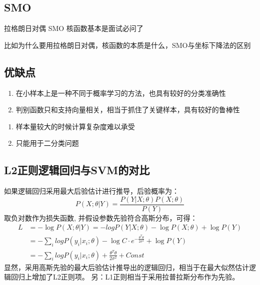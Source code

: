 \subsection{SMO}
拉格朗日对偶
SMO
核函数基本是面试必问了

比如为什么要用拉格朗日对偶，核函数的本质是什么，SMO与坐标下降法的区别

\subsection{优缺点}
{}
\begin{enumerate}
\item 在小样本上是一种不同于概率学习的方法，也具有较好的分类准确性
\item 判别函数只和支持向量相关，相当于抓住了关键样本，具有较好的鲁棒性
\end{enumerate}

{}
\begin{enumerate}
\item 样本量较大的时候计算复杂度难以承受
\item 只能用于二分类问题
\end{enumerate}



\subsection{L2正则逻辑回归与SVM的对比}
如果逻辑回归采用最大后验估计进行推导，后验概率为：
\begin{equation*}
    P(X;\theta|Y) = \frac{P(Y|X;\theta)P(X;\theta)}{P(Y)}
\end{equation*}
取负对数作为损失函数, 并假设参数先验符合高斯分布，可得：
\begin{align*}
    L &= -\log P(X;\theta|Y) = -log P(Y|X;\theta) - \log P(X;\theta) + \log P(Y) \\
    &= -\sum_i log P(y_i|x_i;\theta) - \log C\cdot e^{-\frac{\theta^T\theta}{2\sigma^2}} + \log P(Y) \\
    &= -\sum_i log P(y_i|x_i;\theta) + \frac{\theta^T\theta}{2\sigma^2} + Const
\end{align*}
显然，采用高斯先验的最大后验估计推导出的逻辑回归，相当于在最大似然估计逻辑回归上增加了L2正则项。
另：L1正则相当于采用拉普拉斯分布作为先验。

